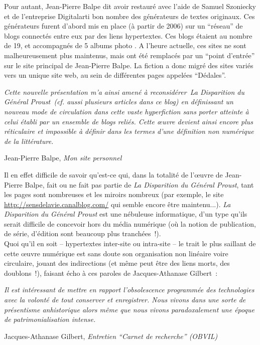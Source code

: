\documentclass{article}
\newenvironment{citationbox}
{\begin{center}
		\begin{minipage}{.8\textwidth}
		}
		{
		\end{minipage}	
\end{center}
}
\begin{document}
					Pour autant, Jean-Pierre Balpe dit avoir restauré avec l'aide de Samuel Szoniecky et de l'entreprise Digitalarti bon nombre des générateurs de textes originaux. Ces générateurs furent d'abord mis en place (à partir de 2006) sur un ``réseau'' de blogs connectés entre eux par des liens hypertextes. Ces blogs étaient au nombre de 19, et accompagnés de 5 albums photo \cite{bordeleau2009}. A l'heure actuelle, ces sites ne sont malheureusement plus maintenus, mais ont été remplacés par un ``point d'entrée'' sur le site principal de Jean-Pierre Balpe. La fiction a donc migré des sites variés vers un unique site web, au sein de différentes pages appelées ``Dédales''.
					\begin{citationbox}
						\textit{Cette nouvelle présentation m'a ainsi amené à reconsidérer La Disparition du Général Proust (cf. aussi plusieurs articles dans ce blog) en définissant un nouveau mode de circulation dans cette vaste hyperfiction sans porter atteinte à celui établi par un ensemble de blogs reliés. Cette œuvre devient ainsi encore plus réticulaire et impossible à définir dans les termes d'une définition non numérique de la littérature.}\begin{flushright}
							Jean-Pierre Balpe, \textit{Mon site personnel}\cite{balpe_blog}
						\end{flushright}
					\end{citationbox}
					Il en effet difficile de savoir qu'est-ce qui, dans la totalité de l'œuvre de Jean-Pierre Balpe, fait ou ne fait pas partie de \textit{La Disparition du Général Proust}, tant les pages sont nombreuses et les miroirs nombreux (par exemple, le site \href{http://sensdelavie.canalblog.com/}{http://sensdelavie.canalblog.com/} qui semble encore être maintenu...). \textit{La Disparition du Général Proust} est une nébuleuse informatique, d'un type qu'ils serait difficile de concevoir hors du média numérique (où la notion de publication, de série, d'édition sont beaucoup plus tranchées~!).\\
					Quoi qu'il en soit -- hypertextes inter-site ou intra-site -- le trait le plus saillant de cette œuvre numérique est sans doute son organisation non linéaire voire circulaire, jouant des indirections (et même peut être des liens morts, des doublons~!), faisant écho à ces paroles de Jacques-Athanase Gilbert~:
					\begin{citationbox}
						\textit{Il est intéressant de mettre en rapport l’obsolescence programmée des technologies avec la volonté de tout conserver et enregistrer. Nous vivons dans une sorte de présentisme anhistorique alors même que nous vivons paradoxalement une époque de patrimonialisation intense.}
						\begin{flushright}
							Jacques-Athanase Gilbert, \textit{Entretien ``Carnet de recherche'' (OBVIL)} \cite{gilbert2018}
						\end{flushright}
					\end{citationbox}
\end{document}
